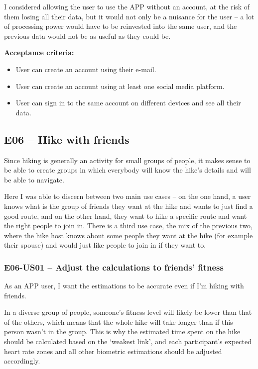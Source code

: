 I considered allowing the user to use the APP without an account, at the risk of them losing all their data, but it would not only be a nuisance for the user --
a lot of processing power would have to be reinvested into the same user, and the previous data would not be as useful as they could be.

\textbf{Acceptance criteria:}
\begin{itemize}
    \item User can create an account using their e-mail.
    \item User can create an account using at least one social media platform.
    \item User can sign in to the same account on different devices and see all their data.
\end{itemize}


\subsection*{E06 -- Hike with friends}

Since hiking is generally an activity for small groups of people, it makes sense to be able to create groups in which everybody will know the hike's details and will be able to navigate.

Here I was able to discern between two main use cases -- on the one hand, a user knows what is the group of friends they want at the hike and wants to just find a good route,
and on the other hand, they want to hike a specific route and want the right people to join in.
There is a third use case, the mix of the previous two, where the hike host knows about some people they want at the hike (for example their spouse) and would just like people to join in if they want to.

\subsubsection*{E06-US01 -- Adjust the calculations to friends' fitness}
As an APP user, I want the estimations to be accurate even if I'm hiking with friends.

In a diverse group of people, someone's fitness level will likely be lower than that of the others, which means that the whole hike will take longer than if this person wasn't in the group.
This is why the estimated time spent on the hike should be calculated based on the `weakest link', and each participant's expected heart rate zones and all other biometric estimations should be adjusted accordingly.

